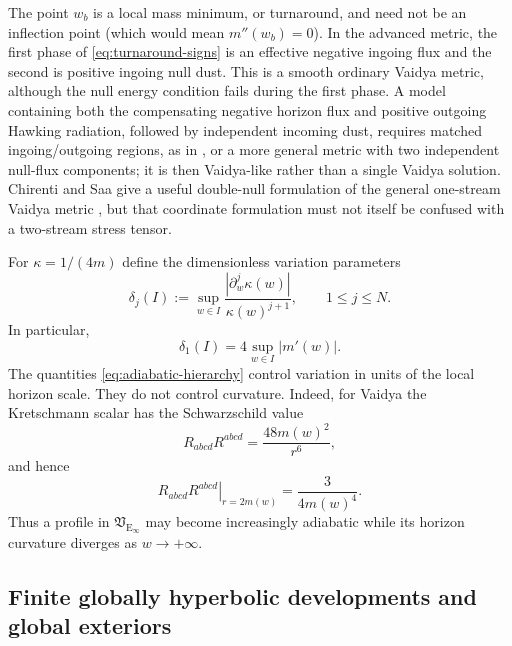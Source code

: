 \documentclass[11pt,a4paper]{article}
\theoremstyle{definition}
\theoremstyle{remark}
\begin{document}
	The point $w_b$ is a local mass minimum, or turnaround, and need not be an
	inflection point (which would mean $m''(w_b)=0$).  In the advanced metric,
	the first phase of \eqref{eq:turnaround-signs} is an effective negative
	ingoing flux and the second is positive ingoing null dust.  This is a smooth
	ordinary Vaidya metric, although the null energy condition fails during the
	first phase.  A model containing both the compensating negative horizon flux
	and positive outgoing Hawking radiation, followed by independent incoming
	dust, requires matched ingoing/outgoing regions, as in
	\cite{Hiscock1981II}, or a more general metric with two independent
	null-flux components; it is then Vaidya-like rather than a single Vaidya
	solution.  Chirenti and Saa give a useful double-null formulation of the
	general one-stream Vaidya metric \cite{ChirentiSaa2012}, but that coordinate
	formulation must not itself be confused with a two-stream stress tensor.
	
	For $\kappa=1/(4m)$ define the dimensionless variation parameters
	\begin{equation}
		\delta_j(I)
		:=\sup_{w\in I}
		\frac{|\partial_w^j\kappa(w)|}{\kappa(w)^{j+1}},
		\qquad 1\leq j\leq N.
		\label{eq:adiabatic-hierarchy}
	\end{equation}
	In particular,
	\begin{equation}
		\delta_1(I)=4\sup_{w\in I}|m'(w)|.
		\label{eq:first-adiabatic-parameter}
	\end{equation}
	The quantities \eqref{eq:adiabatic-hierarchy} control variation in units of
	the local horizon scale.  They do not control curvature.  Indeed, for Vaidya
	the Kretschmann scalar has the Schwarzschild value
	\begin{equation}
		R_{abcd}R^{abcd}=\frac{48m(w)^2}{r^6},
	\end{equation}
	and hence
	\begin{equation}
		\left.R_{abcd}R^{abcd}\right|_{r=2m(w)}
		=\frac{3}{4m(w)^4}.
		\label{eq:horizon-curvature}
	\end{equation}
	Thus a profile in $\mathfrak V_{\mathrm E_\infty}$ may become increasingly
	adiabatic while its horizon curvature diverges as $w\to+\infty$.
	
	\subsection{Finite globally hyperbolic developments and global exteriors}
	
\end{document}

